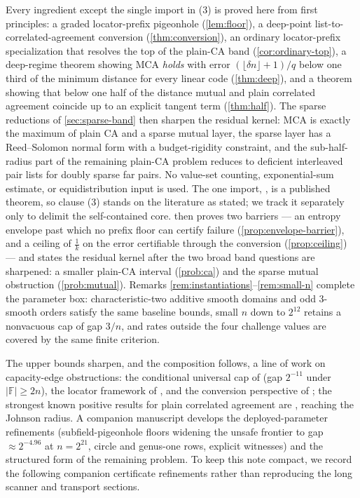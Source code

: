\documentclass[11pt]{amsart}
\theoremstyle{definition}
\theoremstyle{remark}
\newcommand{\F}{\mathbb{F}}
\begin{document}
Every ingredient except the single import in (3) is proved here from first principles: a graded locator-prefix pigeonhole (\cref{lem:floor}), a deep-point list-to-correlated-agreement conversion (\cref{thm:conversion}), an ordinary locator-prefix specialization that resolves the top of the plain-CA band (\cref{cor:ordinary-top}), a deep-regime theorem showing MCA \emph{holds} with error $(\lfloor\delta n\rfloor+1)/q$ below one third of the minimum distance for every linear code (\cref{thm:deep}), and a theorem showing that below one half of the distance mutual and plain correlated agreement coincide up to an explicit tangent term (\cref{thm:half}). The sparse reductions of \cref{sec:sparse-band} then sharpen the residual kernel: MCA is exactly the maximum of plain CA and a sparse mutual layer, the sparse layer has a Reed--Solomon normal form with a budget-rigidity constraint, and the sub-half-radius part of the remaining plain-CA problem reduces to deficient interleaved pair lists for doubly sparse far pairs. No value-set counting, exponential-sum estimate, or equidistribution input is used. The one import, \cite[Thm.~4.1]{BCIKS20}, is a published theorem, so clause (3) stands on the literature as stated; we track it separately only to delimit the self-contained core.  then proves two barriers --- an entropy envelope past which no prefix floor can certify failure (\cref{prop:envelope-barrier}), and a ceiling of $\frac1k$ on the error certifiable through the conversion (\cref{prop:ceiling}) --- and states the residual kernel after the two broad band questions are sharpened: a smaller plain-CA interval (\cref{prob:ca}) and the sparse mutual obstruction (\cref{prob:mutual}). Remarks \ref{rem:instantiations}--\ref{rem:small-n} complete the parameter box: characteristic-two additive smooth domains and odd $3$-smooth orders satisfy the same baseline bounds, small $n$ down to $2^{12}$ retains a nonvacuous cap of gap $3/n$, and rates outside the four challenge values are covered by the same finite criterion.

The upper bounds sharpen, and the composition follows, a line of work on capacity-edge obstructions: the conditional universal cap of \cite{Cho26b} (gap $2^{-11}$ under $|\F|\ge2n$), the locator framework of \cite{Cho26a}, and the conversion perspective of \cite{CS25}; the strongest known positive results for plain correlated agreement are \cite{BCIKS20,BCHKS25}, reaching the Johnson radius. A companion manuscript \cite{Cho26b} develops the deployed-parameter refinements (subfield-pigeonhole floors widening the unsafe frontier to gap $\approx2^{-4.96}$ at $n=2^{21}$, circle and genus-one rows, explicit witnesses) and the structured form of the remaining problem.  To keep this note compact, we record the following companion certificate refinements rather than reproducing the long scanner and transport sections.
\end{document}
